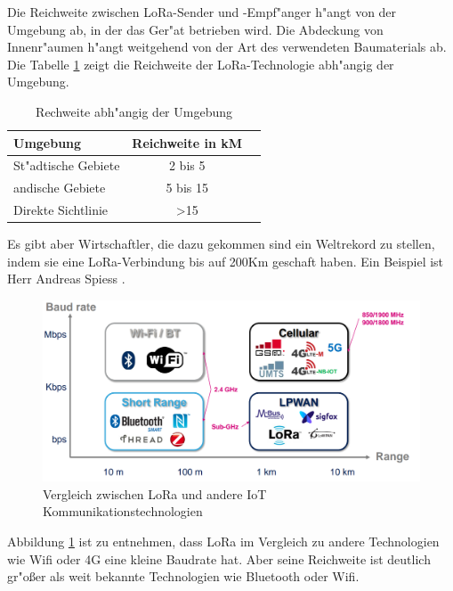 Die Reichweite zwischen LoRa-Sender und -Empf"anger h"angt von der 
Umgebung ab, in der das Ger"at betrieben wird. Die Abdeckung von 
Innenr"aumen h"angt weitgehend von der Art des verwendeten Baumaterials 
ab. Die Tabelle \ref{tab:Range} zeigt die Reichweite der 
LoRa-Technologie abh"angig der Umgebung.

\begin{center}
	\begin{table}[htbp] 
		\centering 
		\Large
		\begin{tabular}{l|c|r}
			\textbf{Umgebung} & \textbf{Reichweite in kM} \\
			\hline
			St"adtische Gebiete	& 2 bis 5 \\
			\hline
			andische Gebiete & 5 bis 15\\
			\hline
			Direkte Sichtlinie	& >15 
		\end{tabular} 
		\caption{Rechweite abh"angig der Umgebung} 
		\label{tab:Range} 
		
	\end{table}
\end{center}

Es gibt aber Wirtschaftler, die dazu gekommen sind ein Weltrekord zu 
stellen, indem sie eine LoRa-Verbindung bis auf 200Km geschaft haben. 
Ein Beispiel ist Herr Andreas Spiess \cite{AndreasSpiess}.


\vspace{10cm}
\begin{figure}[h]
	\centering
	\includegraphics[width=14cm]{source/images/Communications_tech}
	\caption{Vergleich zwischen LoRa und andere IoT 
	Kommunikationstechnologien \cite{LoRaWAN}\label{fig:Netz}}
\end{figure}
Abbildung \ref{fig:Netz} ist zu entnehmen, dass LoRa im Vergleich zu 
andere Technologien wie Wifi oder 4G eine kleine Baudrate hat. Aber 
seine Reichweite ist deutlich gr"o\ss{}er als weit bekannte 
Technologien wie Bluetooth oder Wifi.



